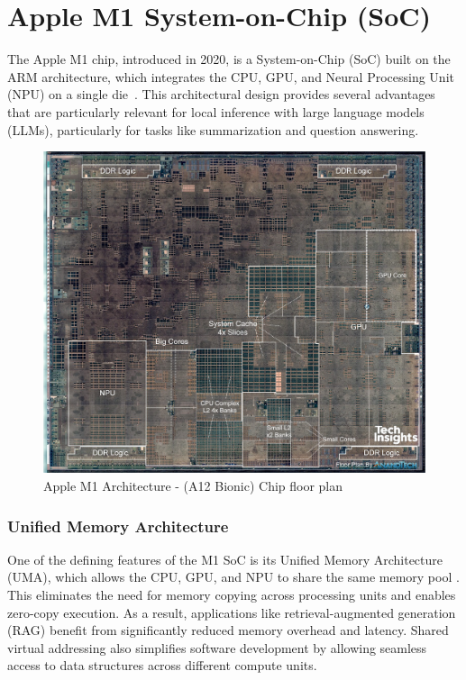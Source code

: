 \section{Apple M1 System-on-Chip (SoC)}
\label{sec:AppleM1System-on-Chip} 

The Apple M1 chip, introduced in 2020, is a System-on-Chip (SoC) built on the ARM architecture, which integrates the CPU, GPU, and Neural Processing Unit (NPU) on a single die~\cite{apple2020m1}. This architectural design provides several advantages that are particularly relevant for local inference with large language models (LLMs), particularly for tasks like summarization and question answering.

\begin{figure}[h]
    \centering
    \includegraphics[width=0.8\linewidth]{images/AppleM1SOC.jpeg}
    \caption{ Apple M1 Architecture - (A12 Bionic) Chip floor plan~\cite{hollemans2020apple}}
    \label{fig:autoregressive_decoding}
\end{figure}

\subsubsection*{Unified Memory Architecture}
One of the defining features of the M1 SoC is its Unified Memory Architecture (UMA), which allows the CPU, GPU, and NPU to share the same memory pool \cite{hollemans2020apple}. This eliminates the need for memory copying across processing units and enables zero-copy execution. As a result, applications like retrieval-augmented generation (RAG) benefit from significantly reduced memory overhead and latency. Shared virtual addressing also simplifies software development by allowing seamless access to data structures across different compute units.

